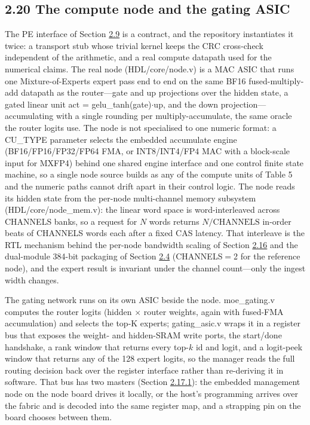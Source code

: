\documentclass[10pt,twocolumn]{article}
\begin{document}
\subsection*{2.20 The compute node and the gating ASIC}\label{sec:2.20}

The PE interface of Section \hyperref[sec:2.9]{2.9} is a contract, and the repository instantiates it twice: a transport stub whose trivial kernel keeps the CRC cross-check independent of the arithmetic, and a real compute datapath used for the numerical claims. The real node (HDL/core/node.v) is a MAC ASIC that runs one Mixture-of-Experts expert pass end to end on the same BF16 fused-multiply-add datapath as the router---gate and up projections over the hidden state, a gated linear unit act = gelu\_tanh(gate)$\cdot$up, and the down projection---accumulating with a single rounding per multiply-accumulate, the same oracle the router logits use. The node is not specialised to one numeric format: a CU\_TYPE parameter selects the embedded accumulate engine (BF16/FP16/FP32/FP64 FMA, or INT8/INT4/FP4 MAC with a block-scale input for MXFP4) behind one shared engine interface and one control finite state machine, so a single node source builds as any of the compute units of Table 5 and the numeric paths cannot drift apart in their control logic. The node reads its hidden state from the per-node multi-channel memory subsystem (HDL/core/node\_mem.v): the linear word space is word-interleaved across CHANNELS banks, so a request for $N$ words returns $N/\mathrm{CHANNELS}$ in-order beats of CHANNELS words each after a fixed CAS latency. That interleave is the RTL mechanism behind the per-node bandwidth scaling of Section \hyperref[sec:2.16]{2.16} and the dual-module 384-bit packaging of Section \hyperref[sec:2.4]{2.4} (CHANNELS$=$2 for the reference node), and the expert result is invariant under the channel count---only the ingest width changes.

The gating network runs on its own ASIC beside the node. moe\_gating.v computes the router logits (hidden $\times$ router weights, again with fused-FMA accumulation) and selects the top-K experts; gating\_asic.v wraps it in a register bus that exposes the weight- and hidden-SRAM write ports, the start/done handshake, a rank window that returns every top-$k$ id and logit, and a logit-peek window that returns any of the 128 expert logits, so the manager reads the full routing decision back over the register interface rather than re-deriving it in software. That bus has two masters (Section \hyperref[sec:2.17.1]{2.17.1}): the embedded management node on the node board drives it locally, or the host's programming arrives over the fabric and is decoded into the same register map, and a strapping pin on the board chooses between them.
\end{document}

